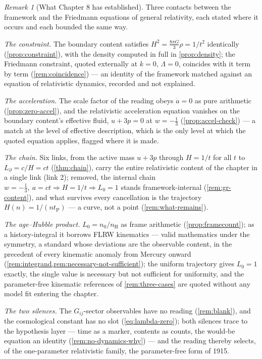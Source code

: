 \documentclass[11pt]{amsbook}
\theoremstyle{plain}
\theoremstyle{definition}
\theoremstyle{remark}
\newtheorem{remark}[theorem]{Remark}
\begin{document}
\begin{remark}[What Chapter 8 has established]\label{rem:ch8summary}
Three contacts between the framework and the Friedmann equations of general relativity, each stated where it occurs and each bounded the same way.

\emph{The constraint.} The boundary content satisfies $H^{2} = \frac{8\pi G}{3}\rho = 1/t^{2}$ identically (\cref{prop:constraint}), with the density computed in full in \cref{prop:density}; the Friedmann constraint, quoted externally at $k = 0$, $\Lambda = 0$, coincides with it term by term (\cref{rem:coincidence}) --- an identity of the framework matched against an equation of relativistic dynamics, recorded and not explained.

\emph{The acceleration.} The scale factor of the reading obeys $\ddot a = 0$ as pure arithmetic (\cref{prop:zero-accel}), and the relativistic acceleration equation vanishes on the boundary content's effective fluid, $u + 3p = 0$ at $w = -\tfrac13$ (\cref{prop:accel-check}) --- a match at the level of effective description, which is the only level at which the quoted equation applies, flagged where it is made.

\emph{The chain.} Six links, from the active mass $u + 3p$ through $H = 1/t$ for all $t$ to $L_{\partial} = c/H = ct$ (\cref{thm:chain}), carry the entire relativistic content of the chapter in a single link (link 2); removed, the internal chain $w = -\tfrac13,\ a = ct \Rightarrow H = 1/t \Rightarrow L_{0} = 1$ stands framework-internal (\cref{rem:gr-content}), and what survives every cancellation is the trajectory $H(n) = 1/(nt_{\mathrm P})$ --- a curve, not a point (\cref{rem:what-remains}).

\emph{The age--Hubble product.} $L_{0} = n_{0}/n_{\mathrm H}$ as frame arithmetic (\cref{prop:framecount}); as a history-integral it borrows FLRW kinematics --- valid mathematics under the symmetry, a standard whose deviations are the observable content, in the precedent of every kinematic anomaly from Mercury onward (\cref{rem:integrand,rem:necessary-not-sufficient}); the uniform trajectory gives $L_{0} = 1$ exactly, the single value is necessary but not sufficient for uniformity, and the parameter-free kinematic references of \cref{rem:three-cases} are quoted without any model fit entering the chapter.

\emph{The two silences.} The $G_{ij}$-sector observables have no reading (\cref{rem:blank}), and the cosmological constant has no slot (\cref{eq:lambda-zero}); both silences trace to the hypothesis layer --- time as a marker, contents as counts, the would-be equation an identity (\cref{rem:no-dynamics-why}) --- and the reading thereby selects, of the one-parameter relativistic family, the parameter-free form of 1915.


\end{remark}
\end{document}
